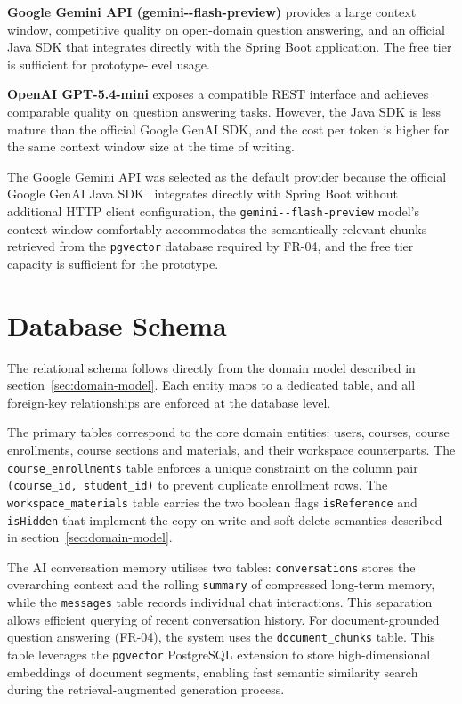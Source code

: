 \textbf{Google Gemini API (gemini--\allowbreak flash-\allowbreak preview)} provides a large context window, competitive
quality on open-domain question answering, and an official Java SDK that integrates directly with
the Spring Boot application. The free tier is sufficient for prototype-level usage.

\textbf{OpenAI GPT-5.4-\allowbreak mini} exposes a compatible REST interface and achieves comparable quality on
question answering tasks. However, the Java SDK is less mature than the official Google GenAI SDK, and the cost per token is higher for the same context window size at the time of writing.

The Google Gemini API was selected as the default provider because the official Google GenAI Java SDK~\cite{GoogleGenAI}
integrates directly with Spring Boot without additional HTTP client configuration, the
\texttt{gemini--\allowbreak flash-\allowbreak preview} model's context window comfortably accommodates the semantically relevant chunks
retrieved from the \texttt{pgvector} database required by FR-04, and the free tier capacity is sufficient for the prototype.

\section{Database Schema}
\label{sec:database-schema}

The relational schema follows directly from the domain model described in
section~\ref{sec:domain-model}. Each entity maps to a dedicated table, and all foreign-key
relationships are enforced at the database level.

The primary tables correspond to the core domain entities: users, courses, course enrollments,
course sections and materials, and their workspace counterparts. The
\texttt{course\_\allowbreak enrollments} table enforces a unique constraint on the column pair
\texttt{(course\_id, \allowbreak student\_id)} to prevent duplicate enrollment rows. The
\texttt{workspace\_\allowbreak materials} table carries the two boolean flags \texttt{isReference}
and \texttt{isHidden} that implement the copy-on-write and soft-delete semantics described
in section~\ref{sec:domain-model}.

The AI conversation memory utilises two tables: \texttt{conversations} stores the overarching
context and the rolling \texttt{summary} of compressed long-term memory, while the
\texttt{messages} table records individual chat interactions. This separation allows efficient
querying of recent conversation history. For document-grounded question answering (FR-04),
the system uses the \texttt{document\_chunks} table. This table leverages the
\texttt{pgvector} PostgreSQL extension to store high-dimensional embeddings of document
segments, enabling fast semantic similarity search during the retrieval-augmented generation
process.


